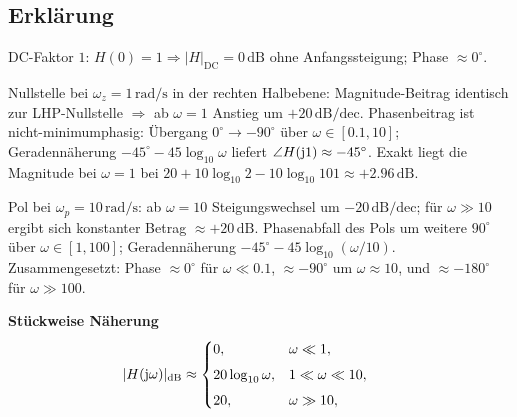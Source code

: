 \begin{center}
\end{center}
\newpage
\subsection{Erklärung}
\vspace{5mm}
\begin{description}[leftmargin=1.2em,labelsep=.6em,font=\bfseries]
\item[Schritt 1] DC-Faktor $1$: $H(0)=1\Rightarrow |H|_{\mathrm{DC}}=0\,\mathrm{dB}$ ohne Anfangssteigung; Phase $\approx0^\circ$.
\item[Schritt 2] Nullstelle bei $\omega_z=1\,\mathrm{rad/s}$ in der rechten Halbebene: Magnitude-Beitrag identisch zur LHP-Nullstelle $\Rightarrow$ ab $\omega=1$ Anstieg um $+20\,\mathrm{dB/dec}$. Phasenbeitrag ist nicht-minimumphasig: Übergang $0^\circ\to-90^\circ$ über $\omega\in[0.1,10]$; Geradennäherung $-45^\circ-45\log_{10}\omega$ liefert $\angle H(\operatorname{j}\!1)\approx-45^\circ$. Exakt liegt die Magnitude bei $\omega=1$ bei $20+10\log_{10}2-10\log_{10}101\approx+2.96\,\mathrm{dB}$.
\item[Schritt 3] Pol bei $\omega_p=10\,\mathrm{rad/s}$: ab $\omega=10$ Steigungswechsel um $-20\,\mathrm{dB/dec}$; für $\omega\gg10$ ergibt sich konstanter Betrag $\approx+20\,\mathrm{dB}$. Phasenabfall des Pols um weitere $90^\circ$ über $\omega\in[1,100]$; Geradennäherung $-45^\circ-45\log_{10}(\omega/10)$. Zusammengesetzt: Phase $\approx0^\circ$ für $\omega\ll0.1$, $\approx-90^\circ$ um $\omega\approx10$, und $\approx-180^\circ$ für $\omega\gg100$.
\end{description}

\vspace{0.5cm}
\medskip
\noindent\textbf{Stückweise Näherung}
\[
|H(\operatorname{j}\!\omega)|_{\mathrm{dB}}\approx
\begin{cases}
0,& \omega\ll1,\\[4pt]
20\log_{10}\omega,& 1\ll\omega\ll10,\\[4pt]
20,& \omega\gg10,
\end{cases}
\qquad
\]
\newpage